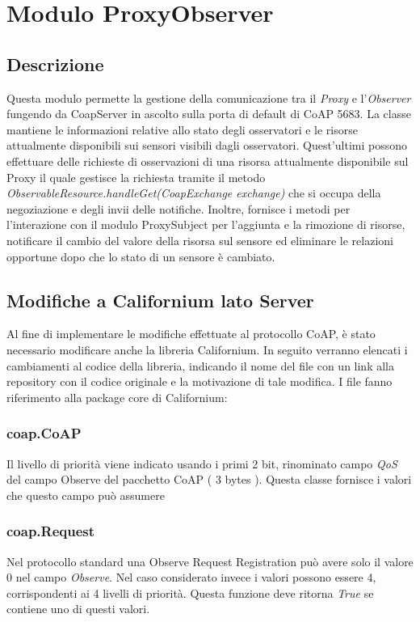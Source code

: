 \chapter{Modulo ProxyObserver}
	\section {Descrizione}
		Questa modulo permette la gestione della comunicazione tra il \textit{Proxy} e l'\textit{Observer} fungendo da CoapServer in ascolto sulla porta di default di CoAP 5683. La classe mantiene le informazioni relative allo stato degli osservatori e le risorse attualmente disponibili sui sensori visibili dagli osservatori. Quest'ultimi possono effettuare delle richieste di osservazioni di una risorsa attualmente disponibile sul Proxy il quale gestisce la richiesta tramite il metodo \textit{ObservableResource.handleGet(CoapExchange exchange)} che si occupa della negoziazione e degli invii delle notifiche. \newline
		Inoltre, fornisce i metodi per l'interazione con il modulo ProxySubject per l'aggiunta e la rimozione di risorse, notificare il cambio del valore della risorsa sul sensore ed eliminare le relazioni opportune dopo che lo stato di un sensore è cambiato.
	\section {Modifiche a Californium lato Server}
			Al fine di implementare le modifiche effettuate al protocollo CoAP, è stato necessario modificare anche la libreria Californium. In seguito verranno elencati i cambiamenti al codice della libreria, indicando il nome del file con un link alla repository con il codice originale e la motivazione di tale modifica. I file fanno riferimento alla package core di Californium:
			\subsection{coap.CoAP}
				Il livello di priorità viene indicato usando i primi 2 bit, rinominato campo \textit{QoS} del campo Observe del pacchetto CoAP ( 3 bytes ).  Questa classe fornisce i valori che questo campo può assumere\newline
				

			\subsection{coap.Request}
				Nel protocollo standard una Observe Request Registration può avere solo il valore 0 nel campo \textit{Observe}. Nel caso considerato invece i valori possono essere 4, corrispondenti ai 4 livelli di priorità. Questa funzione deve ritorna \textit{True} se 	contiene uno di questi valori. \newline
				

